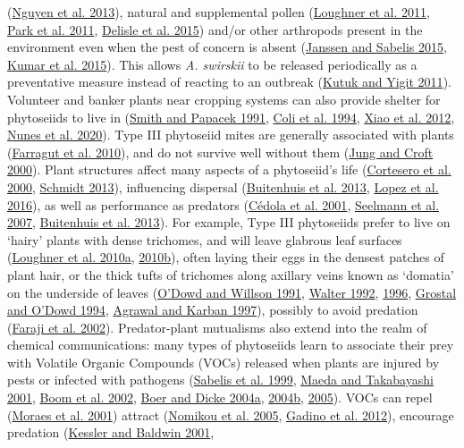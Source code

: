 \documentclass[12pt,final,CPage]{ufthesis}
\begin{document}
{(\protect\hyperlink{ref-Nguyen2013}{Nguyen et al. 2013}), natural and supplemental pollen (\protect\hyperlink{ref-Loughner2011}{Loughner et al. 2011}, \protect\hyperlink{ref-Park2011}{Park et al. 2011}, \protect\hyperlink{ref-Delisle2015}{Delisle et al. 2015}) and/or other arthropods present in the environment even when the pest of concern is absent (\protect\hyperlink{ref-Janssen2015}{Janssen and Sabelis 2015}, \protect\hyperlink{ref-Kumar2015}{Kumar et al. 2015}). This allows \emph{A. swirskii} to be released periodically as a preventative measure instead of reacting to an outbreak (\protect\hyperlink{ref-Kutuk2011}{Kutuk and Yigit 2011}). Volunteer and banker plants near cropping systems can also provide shelter for phytoseiids to live in (\protect\hyperlink{ref-Smith1991}{Smith and Papacek 1991}, \protect\hyperlink{ref-Coli1994}{Coli et al. 1994}, \protect\hyperlink{ref-Xiao2012}{Xiao et al. 2012}, \protect\hyperlink{ref-Nunes2020}{Nunes et al. 2020}). Type III phytoseiid mites are generally associated with plants (\protect\hyperlink{ref-Farragut2010}{Farragut et al. 2010}), and do not survive well without them (\protect\hyperlink{ref-Jung2000}{Jung and Croft 2000}). Plant structures affect many aspects of a phytoseiid's life (\protect\hyperlink{ref-Cortesero2000}{Cortesero et al. 2000}, \protect\hyperlink{ref-Schmidt2013}{Schmidt 2013}), influencing dispersal (\protect\hyperlink{ref-Buitenhuis2013}{Buitenhuis et al. 2013}, \protect\hyperlink{ref-Lopez2016}{Lopez et al. 2016}), as well as performance as predators (\protect\hyperlink{ref-Cedola2001}{Cédola et al. 2001}, \protect\hyperlink{ref-Seelmann2007}{Seelmann et al. 2007}, \protect\hyperlink{ref-Buitenhuis2013}{Buitenhuis et al. 2013}). For example, Type III phytoseiids prefer to live on `hairy' plants with dense trichomes, and will leave glabrous leaf surfaces (\protect\hyperlink{ref-Loughner2010}{Loughner et al. 2010a}, \protect\hyperlink{ref-Loughner2010a}{2010b}), often laying their eggs in the densest patches of plant hair, or the thick tufts of trichomes along axillary veins known as `domatia' on the underside of leaves (\protect\hyperlink{ref-ODowd1991}{O'Dowd and Willson 1991}, \protect\hyperlink{ref-Walter1992}{Walter 1992}, \protect\hyperlink{ref-Walter1996}{1996}, \protect\hyperlink{ref-Grostal1994}{Grostal and O'Dowd 1994}, \protect\hyperlink{ref-Agrawal1997}{Agrawal and Karban 1997}), possibly to avoid predation (\protect\hyperlink{ref-Faraji2002}{Faraji et al. 2002}). Predator-plant mutualisms also extend into the realm of chemical communications: many types of phytoseiids learn to associate their prey with Volatile Organic Compounds (VOCs) released when plants are injured by pests or infected with pathogens (\protect\hyperlink{ref-Sabelis1999}{Sabelis et al. 1999}, \protect\hyperlink{ref-Maeda2001}{Maeda and Takabayashi 2001}, \protect\hyperlink{ref-Boom2002}{Boom et al. 2002}, \protect\hyperlink{ref-Boer2004a}{Boer and Dicke 2004a}, \protect\hyperlink{ref-Boer2004b}{2004b}, \protect\hyperlink{ref-Boer2005}{2005}). VOCs can repel (\protect\hyperlink{ref-Moraes2001}{Moraes et al. 2001}) attract (\protect\hyperlink{ref-Nomikou2005}{Nomikou et al. 2005}, \protect\hyperlink{ref-Gadino2012}{Gadino et al. 2012}), encourage predation (\protect\hyperlink{ref-Kessler2001}{Kessler and Baldwin 2001}, }
\end{document}

